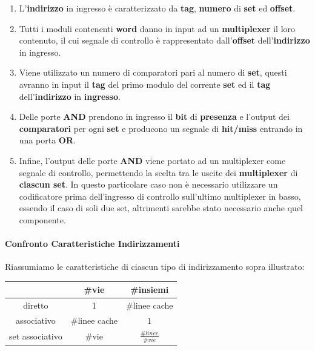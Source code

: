 \documentclass{article}
\begin{document}
\begin{enumerate}
\begin{enumerate}
        \newpage
        
        \item L'\textbf{indirizzo} in ingresso è caratterizzato da \textbf{tag}, \textbf{numero} di \textbf{set} ed \textbf{offset}.
        \item Tutti i moduli contenenti \textbf{word} danno in input ad un \textbf{multiplexer} il loro contenuto, il cui segnale di controllo è rappresentato dall'\textbf{offset} dell'\textbf{indirizzo} in ingresso.
        \item Viene utilizzato un numero di comparatori pari al numero di \textbf{set}, questi avranno in input il \textbf{tag} del primo modulo del corrente \textbf{set} ed il \textbf{tag} dell'\textbf{indirizzo} in \textbf{ingresso}.
        \item Delle porte \textbf{AND} prendono in ingresso il \textbf{bit} di \textbf{presenza} e l'output dei \textbf{comparatori} per ogni \textbf{set} e producono un segnale di \textbf{hit/miss} entrando in una porta \textbf{OR}.
        \item Infine, l'output delle porte \textbf{AND} viene portato ad un multiplexer come segnale di controllo, permettendo la scelta tra le uscite dei \textbf{multiplexer} di \textbf{ciascun set}. In questo particolare caso non è necessario utilizzare un codificatore prima dell'ingresso di controllo sull'ultimo multiplexer in basso, essendo il caso di soli due set, altrimenti sarebbe stato necessario anche quel componente.
    \end{enumerate}
    
\end{enumerate}

\vspace*{15px}

\paragraph{Confronto Caratteristiche Indirizzamenti} Riassumiamo le caratteristiche di ciascun tipo di indirizzamento sopra illustrato:

\vspace*{20px}

\begin{center}
\begin{tabular}{ |c|c c| } %
 \hline
  & \#vie & \#insiemi \\ 
 \hline
 diretto & 1 & \#linee cache \\ 
 associativo & \#linee cache & $1$ \\
 set associativo & \#vie & $\frac{\#linee}{\#vie}$ \\
 \hline
\end{tabular}
\end{center}
\end{document}
